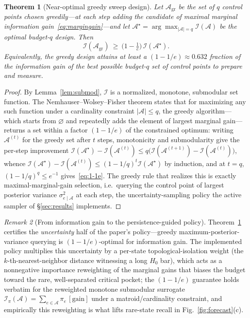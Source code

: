 \documentclass[aps,prresearch,reprint,amsmath,amssymb,nofootinbib,superscriptaddress,floatfix]{revtex4-2}
\newtheorem{theorem}{Theorem}
\theoremstyle{definition}
\theoremstyle{remark}
\newtheorem{remark}[theorem]{Remark}
\theoremstyle{plain}
\begin{document}
\begin{theorem}[Near-optimal greedy sweep design]
\label{thm:greedy}
Let $\mathcal A_{\mathrm{gr}}$ be the set of $q$ control points chosen greedily---at each step adding the
candidate of maximal marginal information gain~\eqref{eq:margingain}---and let $\mathcal A^\star=\arg\max_{|%
\mathcal A|=q}\mathcal I(\mathcal A)$ be the optimal budget-$q$ design. Then
\begin{equation}
\mathcal I(\mathcal A_{\mathrm{gr}})\ \ge\ \Big(1-\tfrac1e\Big)\,\mathcal I(\mathcal A^\star).
\label{eq:1-1e}
\end{equation}
Equivalently, the greedy design attains at least a $(1-1/e)\approx0.632$ fraction of the information gain of
the best possible budget-$q$ set of control points to prepare and measure.
\end{theorem}
\begin{proof}
By Lemma~\ref{lem:submod}, $\mathcal I$ is a normalized, monotone, submodular set function. The
Nemhauser--Wolsey--Fisher theorem \cite{nemhauser1978analysis} states that for maximizing any such function
under a cardinality constraint $|\mathcal A|\le q$, the greedy algorithm---which starts from $\varnothing$
and repeatedly adds the element of largest marginal gain---returns a set within a factor $(1-1/e)$ of the
constrained optimum: writing $\mathcal A^{(t)}$ for the greedy set after $t$ steps, monotonicity and
submodularity give the per-step improvement $\mathcal I(\mathcal A^\star)-\mathcal I(\mathcal A^{(t)})\le
q\big(\mathcal I(\mathcal A^{(t+1)})-\mathcal I(\mathcal A^{(t)})\big)$, whence
$\mathcal I(\mathcal A^\star)-\mathcal I(\mathcal A^{(t)})\le(1-1/q)^t\mathcal I(\mathcal A^\star)$ by
induction, and at $t=q$, $(1-1/q)^q\le e^{-1}$ gives~\eqref{eq:1-1e}. The greedy rule that realizes this is
exactly maximal-marginal-gain selection, i.e.\ querying the control point of largest posterior variance
$\sigma^2_{e\mid\mathcal A}$ at each step, the uncertainty-sampling policy the active sampler of
\S\ref{sec:results} implements.
\end{proof}

\begin{remark}[From information gain to the persistence-guided policy]
\label{rem:activelink}
Theorem~\ref{thm:greedy} certifies the \emph{uncertainty} half of the paper's policy---greedy
maximum-posterior-variance querying is $(1-1/e)$-optimal for information gain. The implemented policy
multiplies this uncertainty by a per-state topological-isolation weight (the $k$-th-nearest-neighbor
distance witnessing a long $H_0$ bar), which acts as a nonnegative importance reweighting of the marginal
gains that biases the budget toward the rare, well-separated critical pocket; the $(1-1/e)$ guarantee holds
verbatim for the reweighted monotone submodular surrogate $\mathcal I_\pi(\mathcal
A)=\sum_{e\in\mathcal A}\pi_e\,[\text{gain}]$ under a matroid/cardinality constraint, and empirically this
reweighting is what lifts rare-state recall in Fig.~\ref{fig:forecast}(c).
\end{remark}
\end{document}

